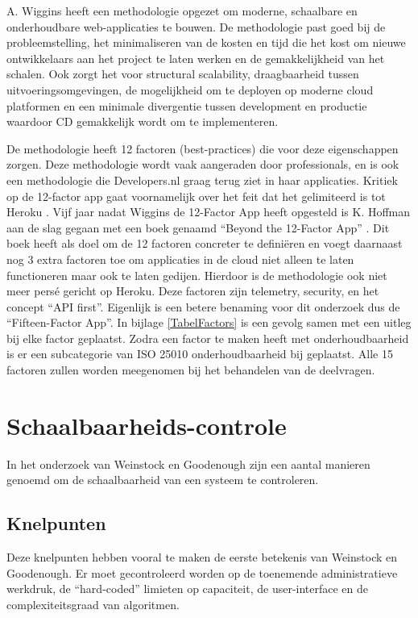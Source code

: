 A. Wiggins \parencite{12Factor} heeft een methodologie opgezet om moderne, schaalbare en onderhoudbare web-applicaties te bouwen. De methodologie past goed bij de probleemstelling, het minimaliseren van de kosten en tijd die het kost om nieuwe ontwikkelaars aan het project te laten werken en de gemakkelijkheid van het schalen. Ook zorgt het voor structural scalability, draagbaarheid tussen uitvoeringsomgevingen, de mogelijkheid om te deployen op moderne cloud platformen en een minimale divergentie tussen development en productie waardoor CD gemakkelijk wordt om te implementeren.

De methodologie heeft 12 factoren (best-practices) die voor deze eigenschappen zorgen. Deze methodologie wordt vaak aangeraden door professionals, en is ook een methodologie die Developers.nl graag terug ziet in haar applicaties. Kritiek op de 12-factor app gaat voornamelijk over het feit dat het gelimiteerd is tot Heroku \parencite{AdaptingTwelveFactor}. Vijf jaar nadat Wiggins de 12-Factor App heeft opgesteld is K. Hoffman aan de slag gegaan met een boek genaamd \enquote{Beyond the 12-Factor App} \parencite{Beyond12Factor}. Dit boek heeft als doel om de 12 factoren concreter te definiëren en voegt daarnaast nog 3 extra factoren toe om applicaties in de cloud niet alleen te laten functioneren maar ook te laten gedijen. Hierdoor is de methodologie ook niet meer persé gericht op Heroku. Deze factoren zijn telemetry, security, en het concept \enquote{API first}. Eigenlijk is een betere benaming voor dit onderzoek dus de \enquote{Fifteen-Factor App}. In bijlage \ref{TabelFactors} is een gevolg samen met een uitleg bij elke factor geplaatst. Zodra een factor te maken heeft met onderhoudbaarheid is er een subcategorie van ISO 25010 onderhoudbaarheid bij geplaatst. Alle 15 factoren zullen worden meegenomen bij het behandelen van de deelvragen.

\section{Schaalbaarheids-controle}

In het onderzoek van Weinstock en Goodenough \parencite{OnSystemScalability} zijn een aantal manieren genoemd om de schaalbaarheid van een systeem te controleren.

\subsection{Knelpunten}
Deze knelpunten hebben vooral te maken de eerste betekenis van Weinstock en Goodenough. Er moet gecontroleerd worden op de toenemende administratieve werkdruk, de \enquote{hard-coded} limieten op capaciteit, de user-interface en de complexiteitsgraad van algoritmen.

